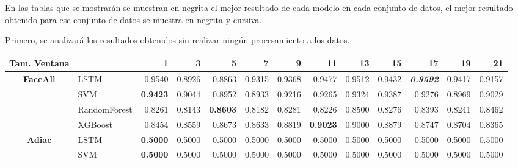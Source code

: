En las tablas que se mostrarán se muestran en negrita el mejor resultado de cada modelo en cada conjunto de datos, el mejor resultado obtenido para ese conjunto de datos se muestra en negrita y cursiva.\newline

Primero, se analizará los resultados obtenidos sin realizar ningún procesamiento a los datos.\newline

\begin{table}[H]
	\centering
	\begin{adjustbox}{max width=12cm}
		\begin{tabular}{|c|l|r|r|r|r|r|r|r|r|r|r|r|}
			\hline
			\textbf{Tam. Ventana} &              & 1                        & 3               & 5               & 7                        & 9      & 11              & 13     & 15              & 17                       & 19              & 21                       \\
			\hline
			\textbf{FaceAll}      & LSTM         & 0.9540                   & 0.8926          & 0.8863          & 0.9315                   & 0.9368 & 0.9477          & 0.9512 & 0.9432          & \textit{\textbf{0.9592}} & 0.9417          & 0.9157                   \\
			                      & SVM          & \textbf{0.9423}          & 0.9044          & 0.8952          & 0.8933                   & 0.9216 & 0.9265          & 0.9324 & 0.9387          & 0.9276                   & 0.8969          & 0.9029                   \\
			                      & RandomForest & 0.8261                   & 0.8143          & \textbf{0.8603} & 0.8182                   & 0.8281 & 0.8226          & 0.8500 & 0.8276          & 0.8393                   & 0.8241          & 0.8462                   \\
			                      & XGBoost      & 0.8454                   & 0.8559          & 0.8673          & 0.8633                   & 0.8819 & \textbf{0.9023} & 0.9000 & 0.8879          & 0.8747                   & 0.8704          & 0.8365                   \\
			\hline
			\textbf{Adiac}        & LSTM         & \textbf{0.5000}          & 0.5000          & 0.5000          & 0.5000                   & 0.5000 & 0.5000          & 0.5000 & 0.5000          & 0.5000                   & 0.5000          & 0.5000                   \\
			                      & SVM          & \textbf{0.5000}          & 0.5000          & 0.5000          & 0.5000                   & 0.5000 & 0.5000          & 0.5000 & 0.5000          & 0.5000                   & 0.5000          & 0.5000                   \\

\end{tabular}
\end{adjustbox}
\end{table}
